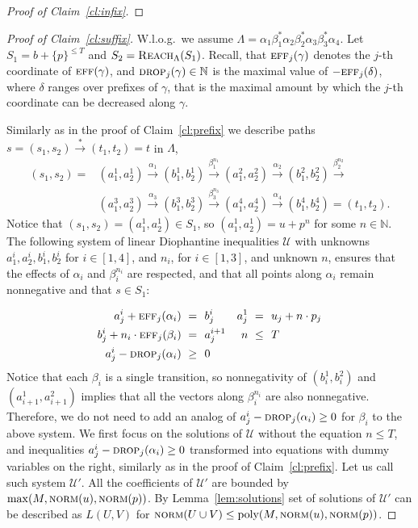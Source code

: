 \documentclass[a4paper, UKenglish, cleveref, autoref, thm-restate]{lipics-v2021}
\newcommand{\N}{\mathbb{N}}
\newcommand{\U}{\mathcal{U}}
\newcommand{\set}[1]{\{#1\}}
\newcommand{\reach}{\textsc{Reach}}
\newcommand{\trans}[1]{\stackrel{#1}{\longrightarrow}}
\newcommand{\tran}{\trans{*}}
\newcommand{\norm}{\textsc{norm}}
\newcommand{\eff}{\textsc{eff}}
\newcommand{\drop}{\textsc{drop}}
\newcommand{\poly}{\textup{poly}}
\newcommand{\Wlog}{W.l.o.g.~}
\begin{document}
\begin{appendixproof}
\begin{proof}[Proof of Claim~\ref{cl:infix}]
\end{proof}



 

\begin{proof}[Proof of Claim~\ref{cl:suffix}]
\Wlog we assume $\Lambda = \alpha_1\beta_1^*\alpha_2\beta_2^*\alpha_3\beta_3^*\alpha_4$.
Let $S_1 = b + \set{p}^{\leq T}$  and $S_2 = \reach_{\Lambda}(S_1)$. Recall, that $\eff_j(\gamma)$ denotes the $j$-th coordinate of $\eff(\gamma)$, and
$\drop_j(\gamma)\in\N$ is the maximal value of $-\eff_j(\delta)$, where $\delta$ ranges over prefixes of $\gamma$,
that is  the maximal amount by which the $j$-th coordinate can be decreased along $\gamma$.

Similarly as in the proof of Claim~\ref{cl:prefix} we describe paths $s = (s_1,s_2) \tran (t_1, t_2) = t$ in $\Lambda$,
\begin{align*}
(s_1, s_2) = &
(a_1^1, a_2^1) \trans{\alpha_1} (b_1^1, b_2^1) \trans{\beta_1^{n_1}}
(a_1^2, a_2^2) \trans{\alpha_2} (b_1^2, b_2^2) \trans{\beta_2^{n_2}} \\
& (a_1^3, a_2^3) \trans{\alpha_3} (b_1^3, b_2^3) \trans{\beta_3^{n_3}}
(a_1^4, a_2^4) \trans{\alpha_4} (b_1^4, b_2^4) = (t_1, t_2).
\end{align*}
Notice that $(s_1, s_2) = (a_1^1, a_2^1) \in S_1$, so $(a_1^1, a_2^1) = u + p^n$ for some $n \in \N$. The following system of linear Diophantine inequalities $\U$ with unknowns $a_1^i, a_2^i, b_1^i, b_2^i$ for $i \in [1,4]$, and $n_i$, for $i \in [1,3]$, and unknown $n$, ensures that the effects of $\alpha_i$ and $\beta_i^{n_i}$ are respected, and that all points along $\alpha_i$ remain nonnegative and that $s \in S_1$:

\begin{align*}
a^{i}_j + \eff_j(\alpha_i) \ = \ & \ b^{i}_j  & a^1_j \ = \ & \ u_j + n \cdot p_j \\
b^{i}_j + n_i \cdot \eff_j(\beta_i) \ = \ & \ a^{i+1}_j & n \ \leq \ & \ T \label{eq:LPS_bound} \\
a^i_j - \drop_j(\alpha_i) \ \geq \ & \ 0 
\end{align*}
Notice that each $\beta_i$ is a single transition, so nonnegativity of $(b_i^1, b_i^2)$ and $(a_{i+1}^1, a_{i+1}^2)$
implies that all the vectors along  $\beta_i^{n_i}$ are also nonnegative. Therefore, we do not need to
add an analog of $a^i_j - \drop_j(\alpha_i) \geq 0$ for $\beta_i$ to the above system. We first focus on the solutions of $\U$ without the equation $n \leq T$, 
and inequalities $a^i_j - \drop_j(\alpha_i) \geq 0$ transformed into equations with dummy variables on the right, similarly as in the proof of Claim~\ref{cl:prefix}. Let us call such system $\U'$. All the coefficients of $\U'$ are bounded by $\max(M, \norm(u), \norm(p))$. By Lemma~\ref{lem:solutions} set of solutions of $\U'$ can be described as $L(U, V)$ for $\norm(U \cup V) \leq \poly(M, \norm(u), \norm(p))$.




\end{proof}
\end{appendixproof}
\end{document}
